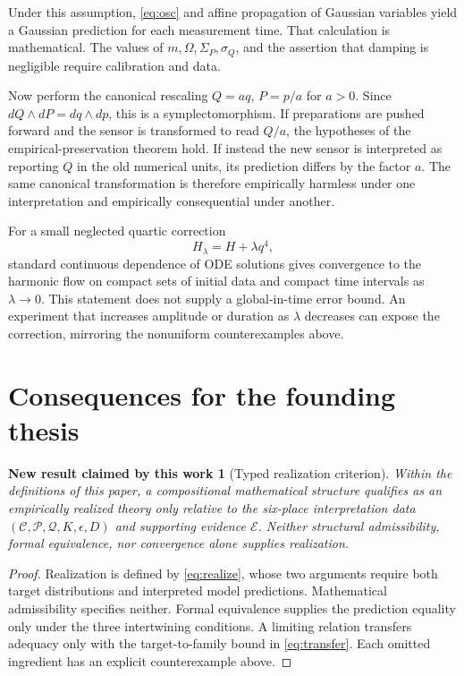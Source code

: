 \documentclass[11pt]{article}
\newtheorem{newresult}[definition]{New result claimed by this work}
\begin{document}
Under this assumption, \eqref{eq:osc} and affine propagation of Gaussian variables yield a Gaussian prediction for each measurement time.  That calculation is mathematical.  The values of $m,\Omega,\Sigma_P,\sigma_Q$, and the assertion that damping is negligible require calibration and data.

Now perform the canonical rescaling $Q=aq$, $P=p/a$ for $a>0$.  Since $dQ\wedge dP=dq\wedge dp$, this is a symplectomorphism.  If preparations are pushed forward and the sensor is transformed to read $Q/a$, the hypotheses of the empirical-preservation theorem hold.  If instead the new sensor is interpreted as reporting $Q$ in the old numerical units, its prediction differs by the factor $a$.  The same canonical transformation is therefore empirically harmless under one interpretation and empirically consequential under another.

For a small neglected quartic correction
\[
 H_\lambda=H+\lambda q^4,
\]
standard continuous dependence of ODE solutions gives convergence to the harmonic flow on compact sets of initial data and compact time intervals as $\lambda\to0$.  This statement does not supply a global-in-time error bound.  An experiment that increases amplitude or duration as $\lambda$ decreases can expose the correction, mirroring the nonuniform counterexamples above.

\section{Consequences for the founding thesis}

\begin{newresult}[Typed realization criterion]
Within the definitions of this paper, a compositional mathematical structure qualifies as an empirically realized theory only relative to the six-place interpretation data $(\mathcal C,\mathcal P,\mathcal Q,K,\epsilon,D)$ and supporting evidence $\mathcal E$.  Neither structural admissibility, formal equivalence, nor convergence alone supplies realization.
\end{newresult}
\begin{proof}
Realization is defined by \eqref{eq:realize}, whose two arguments require both target distributions and interpreted model predictions.  Mathematical admissibility specifies neither.  Formal equivalence supplies the prediction equality only under the three intertwining conditions.  A limiting relation transfers adequacy only with the target-to-family bound in \eqref{eq:transfer}.  Each omitted ingredient has an explicit counterexample above.
\end{proof}
\end{document}
